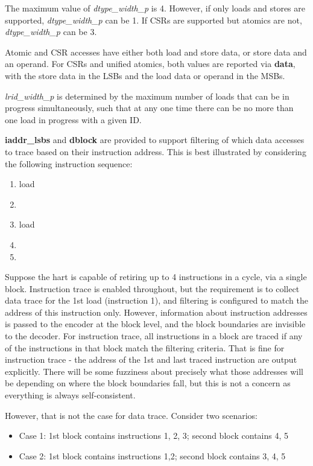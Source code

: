 The maximum value of \textit{dtype\_width\_p} is 4.  However, if only loads and stores are supported, 
\textit{dtype\_width\_p} can be 1.  If CSRs are supported but atomics are not, \textit{dtype\_width\_p} can be 3.

Atomic and CSR accesses have either both load and store data, or store data and an operand.  For CSRs and unified
atomics, both values are reported via \textbf{data}, with the store data in the LSBs and the load data or operand
in the MSBs.

\textit{lrid\_width\_p} is determined by the maximum number of loads that can be in progress simultaneously, such
that at any one time there can be no more than one load in progress with a given ID.

\textbf{iaddr\_lsbs} and \textbf{dblock} are provided to support filtering of which data accesses to trace
based on their instruction address.  This is best illustrated by considering the following instruction sequence:

\begin{enumerate}
  \item load
  \item <some non data access instruction>
  \item load
  \item <some non data access instruction>
  \item <some non data access instruction>
\end{enumerate}
 
Suppose the hart is capable of retiring up to 4 instructions in a cycle, via a single block.   Instruction trace is 
enabled throughout, but the requirement is to collect data trace for the 1st load (instruction 1), and filtering is
configured to match the address of this instruction only.  However, information about instruction addresses is passed 
to the encoder at the block level, and the block boundaries are invisible to the decoder.  For instruction trace, 
all instructions in a block are traced if any of the instructions in that block match the filtering criteria.  
That is fine for instruction trace - the address of the 1st and last traced instruction are output explicitly.  
There will be some fuzziness about precisely what those addresses will be depending on where the block boundaries 
fall, but this is not a concern as everything is always self-consistent.
 
However, that is not the case for data trace.  Consider two scenarios:

\begin{itemize}
  \item Case 1: 1st block contains instructions 1, 2, 3; second block contains 4, 5
  \item Case 2: 1st block contains instructions 1,2; second block contains 3, 4, 5
\end{itemize}
 
